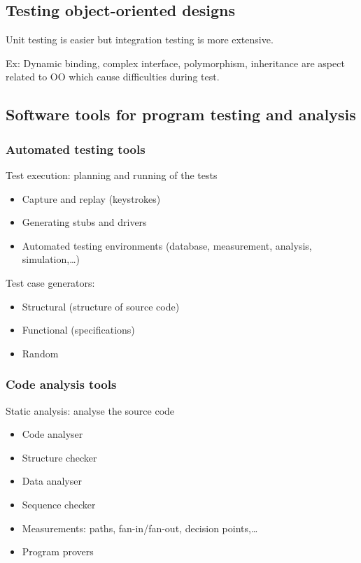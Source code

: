 \subsection{Testing object-oriented designs}
Unit testing is easier but integration testing is more extensive. \newline

Ex: Dynamic binding, complex interface, polymorphism, inheritance are aspect related to OO which cause difficulties during test.

\subsection{Software tools for program testing and analysis}

\subsubsection{Automated testing tools}

Test execution: planning and running of the tests

\begin{itemize}
    \item Capture and replay (keystrokes)
    \item Generating stubs and drivers
    \item Automated testing environments (database, measurement, analysis, simulation,\ldots)
\end{itemize}

Test case generators:

\begin{itemize}
    \item Structural (structure of source code)
    \item Functional (specifications)
    \item Random
\end{itemize}

\subsubsection{Code analysis tools}

Static analysis: analyse the source code

\begin{itemize}
    \item Code analyser
    \item Structure checker
    \item Data analyser
    \item Sequence checker
    \item Measurements: paths, fan-in/fan-out, decision points,\ldots
    \item Program provers
\end{itemize}

